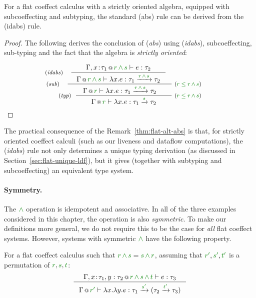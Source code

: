 \begin{remark}
\label{thm:flat-alt-abs}
For a flat coeffect calculus with a strictly oriented algebra, equipped with subcoeffecting and
subtyping, the standard (abs) rule can be derived from the (idabs) rule.
\end{remark}
\begin{proof}
The following derives the conclusion of (\emph{abs}) using (\emph{idabs}), subcoeffecting,
sub-typing and the fact that the algebra is \emph{strictly oriented}:

\begin{equation*}
\tyrule{typ}
  {\hspace{-5em} \tyrule{sub}
     {\hspace{-4em} \tyrule{idabs}
        {\coctx{\Gamma, x\!:\!\tau_1}{\cclrd{r} \,\czip\, \cclrd{s}} \vdash e : \tau_2}
        {\coctx{\Gamma}{\cclrd{r} \,\czip\, \cclrd{s}} \vdash \lambda x.e : \tau_1 \xrightarrow{\cclrd{r} \,\czip\, \cclrd{s}} \tau_2 } }
     {\coctx{\Gamma}{\cclrd{r}} \vdash \lambda x.e : \tau_1 \xrightarrow{\cclrd{r} \,\czip\, \cclrd{s}} \tau_2} \;
           \textnormal{\footnotesize{($\cclrd{r} \;\cleq\; \cclrd{r} \,\czip\, \cclrd{s}$)}} \hspace{-5em} }
  {\coctx{\Gamma}{\cclrd{r}} \vdash \lambda x.e : \tau_1 \xrightarrow{\cclrd{s}} \tau_2} \;
           \textnormal{\footnotesize{($\cclrd{r} \;\cleq\; \cclrd{r} \,\czip\, \cclrd{s}$)}}
\end{equation*}
\end{proof}

\noindent
The practical consequence of the Remark~\ref{thm:flat-alt-abs} is that, for strictly
oriented coeffect calculi (such as our liveness and dataflow computations), the (\emph{idabs})
rule not only determines a unique typing derivation (as discussed in Section~\ref{sec:flat-unique-ldf}),
but it gives (together with subtyping and subcoeffecting) an equivalent type system.

\paragraph{Symmetry.}
The $\czip$ operation is idempotent and associative. In all of the three examples considered in
this chapter, the operation is also \emph{symmetric}. To make our definitions more general, we
do not require this to be the case for \emph{all} flat coeffect systems. However, systems with
symmetric $\czip$ have the following property.

\begin{remark}
For a flat coeffect calculus such that $\cclrd{r}\,\czip\,\cclrd{s} = \cclrd{s}\,\czip\,\cclrd{r}$,
assuming that $\cclrd{r'}, \cclrd{s'}, \cclrd{t'}$ is a permutation of $\cclrd{r},\cclrd{s},\cclrd{t}$:
%
\begin{equation*}
\inference
  {\coctx{\Gamma, x\!:\!\tau_1, y:\tau_2}{\cclrd{r} \,\czip\, \cclrd{s} \,\czip\, \cclrd{t}} \vdash e : \tau_3}
  {\coctx{\Gamma}{\cclrd{r'}} \vdash \lambda x.\lambda y.e :
      \tau_1 \xrightarrow{\cclrd{s'}} (\tau_2 \xrightarrow{\cclrd{t'}} \tau_3) }
\end{equation*}
\end{remark}

